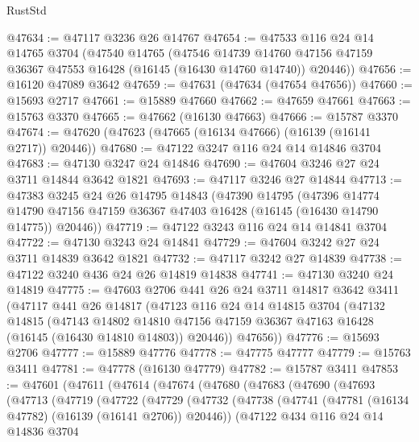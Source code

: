 \begin{lexlean}{RustStd}
\begin{coremodule}
@47634 := @47117 @3236 @26 @14767
@47654 := @47533
    @116
    @24
    @14
    @14765
    @3704
    (@47540
      @14765
      (@47546
        @14739
        @14760
        @47156
        @47159
        @36367
        @47553
        @16428
        (@16145 (@16430 @14760 @14740))
        @20446))
@47656 := @16120 @47089 @3642
@47659 := @47631 (@47634 (@47654 @47656))
@47660 := @15693 @2717
@47661 := @15889 @47660
@47662 := @47659 @47661
@47663 := @15763 @3370
@47665 := @47662 (@16130 @47663)
@47666 := @15787 @3370
@47674 := @47620 (@47623 (@47665 (@16134 @47666) (@16139 (@16141 @2717)) @20446))
@47680 := @47122 @3247 @116 @24 @14 @14846 @3704
@47683 := @47130 @3247 @24 @14846
@47690 := @47604 @3246 @27 @24 @3711 @14844 @3642 @1821
@47693 := @47117 @3246 @27 @14844
@47713 := @47383
    @3245
    @24
    @26
    @14795
    @14843
    (@47390
      @14795
      (@47396
        @14774
        @14790
        @47156
        @47159
        @36367
        @47403
        @16428
        (@16145 (@16430 @14790 @14775))
        @20446))
@47719 := @47122 @3243 @116 @24 @14 @14841 @3704
@47722 := @47130 @3243 @24 @14841
@47729 := @47604 @3242 @27 @24 @3711 @14839 @3642 @1821
@47732 := @47117 @3242 @27 @14839
@47738 := @47122 @3240 @436 @24 @26 @14819 @14838
@47741 := @47130 @3240 @24 @14819
@47775 := @47603
    @2706
    @441
    @26
    @24
    @3711
    @14817
    @3642
    @3411
    (@47117
      @441
      @26
      @14817
      (@47123
        @116
        @24
        @14
        @14815
        @3704
        (@47132
          @14815
          (@47143
            @14802
            @14810
            @47156
            @47159
            @36367
            @47163
            @16428
            (@16145 (@16430 @14810 @14803))
            @20446))
        @47656))
@47776 := @15693 @2706
@47777 := @15889 @47776
@47778 := @47775 @47777
@47779 := @15763 @3411
@47781 := @47778 (@16130 @47779)
@47782 := @15787 @3411
@47853 := @47601
    (@47611
      (@47614
        (@47674
          (@47680
            (@47683
              (@47690
                (@47693
                  (@47713
                    (@47719
                      (@47722
                        (@47729
                          (@47732
                            (@47738
                              (@47741 (@47781 (@16134 @47782) (@16139 (@16141 @2706)) @20446))
                              (@47122
                                @434
                                @116
                                @24
                                @14
                                @14836
                                @3704

\end{coremodule}
\end{lexlean}
